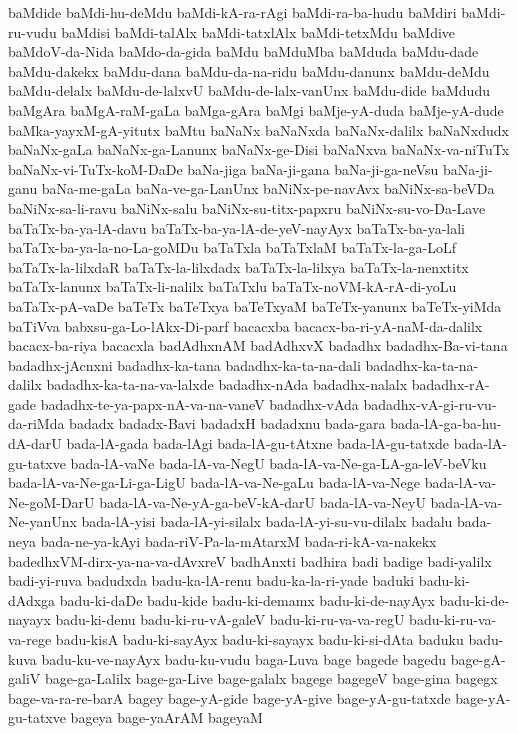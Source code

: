 {baMdide
baMdi-hu-deMdu
baMdi-kA-ra-rAgi
baMdi-ra-ba-hudu
baMdiri
baMdi-ru-vudu
baMdisi
baMdi-talAlx
baMdi-tatxlAlx
baMdi-tetxMdu
baMdive
baMdoV-da-Nida
baMdo-da-gida
baMdu
baMduMba
baMduda
baMdu-dade
baMdu-dakekx
baMdu-dana
baMdu-da-na-ridu
baMdu-danunx
baMdu-deMdu
baMdu-delalx
baMdu-de-lalxvU
baMdu-de-lalx-vanUnx
baMdu-dide
baMdudu
baMgAra
baMgA-raM-gaLa
baMga-gAra
baMgi
baMje-yA-duda
baMje-yA-dude
baMka-yayxM-gA-yitutx
baMtu
baNaNx
baNaNxda
baNaNx-dalilx
baNaNxdudx
baNaNx-gaLa
baNaNx-ga-Lanunx
baNaNx-ge-Disi
baNaNxva
baNaNx-va-niTuTx
baNaNx-vi-TuTx-koM-DaDe
baNa-jiga
baNa-ji-gana
baNa-ji-ga-neVsu
baNa-ji-ganu
baNa-me-gaLa
baNa-ve-ga-LanUnx
baNiNx-pe-navAvx
baNiNx-sa-beVDa
baNiNx-sa-li-ravu
baNiNx-salu
baNiNx-su-titx-papxru
baNiNx-su-vo-Da-Lave
baTaTx-ba-ya-lA-davu
baTaTx-ba-ya-lA-de-yeV-nayAyx
baTaTx-ba-ya-lali
baTaTx-ba-ya-la-no-La-goMDu
baTaTxla
baTaTxlaM
baTaTx-la-ga-LoLf
baTaTx-la-lilxdaR
baTaTx-la-lilxdadx
baTaTx-la-lilxya
baTaTx-la-nenxtitx
baTaTx-lanunx
baTaTx-li-nalilx
baTaTxlu
baTaTx-noVM-kA-rA-di-yoLu
baTaTx-pA-vaDe
baTeTx
baTeTxya
baTeTxyaM
baTeTx-yanunx
baTeTx-yiMda
baTiVva
babxsu-ga-Lo-lAkx-Di-parf
bacacxba
bacacx-ba-ri-yA-naM-da-dalilx
bacacx-ba-riya
bacacxla
badAdhxnAM
badAdhxvX
badadhx
badadhx-Ba-vi-tana
badadhx-jAcnxni
badadhx-ka-tana
badadhx-ka-ta-na-dali
badadhx-ka-ta-na-dalilx
badadhx-ka-ta-na-va-lalxde
badadhx-nAda
badadhx-nalalx
badadhx-rA-gade
badadhx-te-ya-papx-nA-va-na-vaneV
badadhx-vAda
badadhx-vA-gi-ru-vu-da-riMda
badadx
badadx-Bavi
badadxH
badadxnu
bada-gara
bada-lA-ga-ba-hu-dA-darU
bada-lA-gada
bada-lAgi
bada-lA-gu-tAtxne
bada-lA-gu-tatxde
bada-lA-gu-tatxve
bada-lA-vaNe
bada-lA-va-NegU
bada-lA-va-Ne-ga-LA-ga-leV-beVku
bada-lA-va-Ne-ga-Li-ga-LigU
bada-lA-va-Ne-gaLu
bada-lA-va-Nege
bada-lA-va-Ne-goM-DarU
bada-lA-va-Ne-yA-ga-beV-kA-darU
bada-lA-va-NeyU
bada-lA-va-Ne-yanUnx
bada-lA-yisi
bada-lA-yi-silalx
bada-lA-yi-su-vu-dilalx
badalu
bada-neya
bada-ne-ya-kAyi
bada-riV-Pa-la-mAtarxM
bada-ri-kA-va-nakekx
badedhxVM-dirx-ya-na-va-dAvxreV
badhAnxti
badhira
badi
badige
badi-yalilx
badi-yi-ruva
badudxda
badu-ka-lA-renu
badu-ka-la-ri-yade
baduki
badu-ki-dAdxga
badu-ki-daDe
badu-kide
badu-ki-demamx
badu-ki-de-nayAyx
badu-ki-de-nayayx
badu-ki-denu
badu-ki-ru-vA-galeV
badu-ki-ru-va-va-regU
badu-ki-ru-va-va-rege
badu-kisA
badu-ki-sayAyx
badu-ki-sayayx
badu-ki-si-dAta
baduku
badu-kuva
badu-ku-ve-nayAyx
badu-ku-vudu
baga-Luva
bage
bagede
bagedu
bage-gA-galiV
bage-ga-Lalilx
bage-ga-Live
bage-galalx
bagege
bagegeV
bage-gina
bagegx
bage-va-ra-re-barA
bagey
bage-yA-gide
bage-yA-give
bage-yA-gu-tatxde
bage-yA-gu-tatxve
bageya
bage-yaArAM
bageyaM
}
